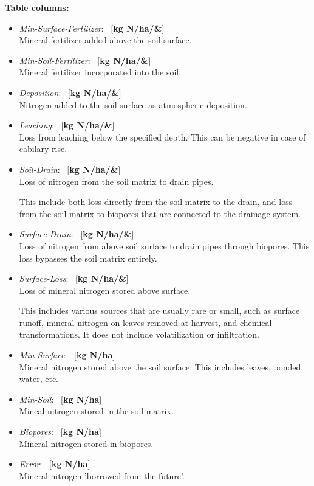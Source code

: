 \documentclass[a4paper]{article}
\begin{document}
\textbf{Table columns:}\begin{itemize}
\item \textit{Min-Surface-Fertilizer}: ~$[$\textbf{kg N/ha/\&}$]$\\
Mineral fertilizer added above the soil surface.
\item \textit{Min-Soil-Fertilizer}: ~$[$\textbf{kg N/ha/\&}$]$\\
Mineral fertilizer incorporated into the soil.
\item \textit{Deposition}: ~$[$\textbf{kg N/ha/\&}$]$\\
Nitrogen added to the soil surface as atmospheric deposition.
\item \textit{Leaching}: ~$[$\textbf{kg N/ha/\&}$]$\\
Loss from leaching below the specified depth.  
This can be negative in case of cabilary rise.
\item \textit{Soil-Drain}: ~$[$\textbf{kg N/ha/\&}$]$\\
Loss of nitrogen from the soil matrix to drain pipes.

This include both loss directly from the soil matrix to the
drain, and loss from the soil matrix to biopores that are
connected to the drainage system.
\item \textit{Surface-Drain}: ~$[$\textbf{kg N/ha/\&}$]$\\
Loss of nitrogen from above soil surface to drain pipes through biopores.
This loss bypasses the soil matrix entirely.
\item \textit{Surface-Loss}: ~$[$\textbf{kg N/ha/\&}$]$\\
Loss of mineral nitrogen stored above surface.

This includes various sources that are usually rare or small,
such as surface runoff, mineral nitrogen on leaves removed at
harvest, and chemical transformations.  It does not include
volatilization or infiltration.
\item \textit{Min-Surface}: ~$[$\textbf{kg N/ha}$]$\\
Mineral nitrogen stored above the soil surface.
This includes leaves, ponded water, etc.
\item \textit{Min-Soil}: ~$[$\textbf{kg N/ha}$]$\\
Mineal nitrogen stored in the soil matrix.
\item \textit{Biopores}: ~$[$\textbf{kg N/ha}$]$\\
Mineral nitrogen stored in biopores.
\item \textit{Error}: ~$[$\textbf{kg N/ha}$]$\\
Mineral nitrogen 'borrowed from the future'. 


\end{itemize}
\end{document}

